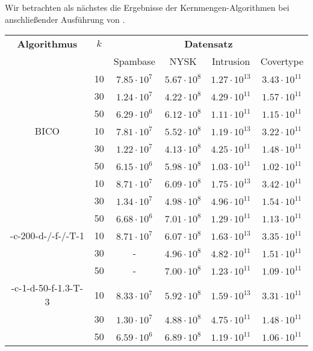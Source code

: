 Wir betrachten als nächstes die Ergebnisse der Kernmengen-Algorithmen bei anschließender Ausführung von \kmpp.
\begin{table}[h]
\centering
\begin{tabular}{@{}cccccc@{}} \toprule
	\textbf{Algorithmus} & $k$ & \multicolumn{4}{c}{\textbf{Datensatz}} \\
	\cmidrule(r){3-6} & 		& Spambase 				& NYSK 				& Intrusion 			& Covertype \\ \toprule
	\Skmpp 						& 10 & $7.85 \cdot 10^7$ & $5.67 \cdot 10^8$ & $1.27 \cdot 10^{13}$ & $3.43 \cdot 10^{11}$ \\
		 						& 30 & $1.24 \cdot 10^7$ & $4.22 \cdot 10^8$ & $4.29 \cdot 10^{11}$ & $1.57 \cdot 10^{11}$ \\
		 						& 50 & $6.29 \cdot 10^6$ & $6.12 \cdot 10^8$ & $1.11 \cdot 10^{11}$ & $1.15 \cdot 10^{11}$ \\
	\midrule
	BICO 						& 10 & $7.81 \cdot 10^7$ & $5.52 \cdot 10^8$ & $1.19 \cdot 10^{13}$ & $3.22 \cdot 10^{11}$ \\
			 					& 30 & $1.22 \cdot 10^7$ & $4.13 \cdot 10^8$ & $4.25 \cdot 10^{11}$ & $1.48 \cdot 10^{11}$ \\
		 						& 50 & $6.15 \cdot 10^6$ & $5.98 \cdot 10^8$ & $1.03 \cdot 10^{11}$ & $1.02 \cdot 10^{11}$ \\
	\midrule
	\kmpp 						& 10 & $8.71 \cdot 10^7$ & $6.09 \cdot 10^8$ & $1.75 \cdot 10^{13}$ & $3.42 \cdot 10^{11}$ \\
			 					& 30 & $1.34 \cdot 10^7$ & $4.98 \cdot 10^8$ & $4.96 \cdot 10^{11}$ & $1.54 \cdot 10^{11}$ \\
		 						& 50 & $6.68 \cdot 10^6$ & $7.01 \cdot 10^8$ & $1.29 \cdot 10^{11}$ & $1.13 \cdot 10^{11}$ \\
	\midrule
	\CsTwo-c-200-d-/-f-/-T-1	& 10 & $8.71 \cdot 10^7$ & $6.07 \cdot 10^8$ & $1.63 \cdot 10^{13}$ & $3.35 \cdot 10^{11}$ \\
			 					& 30 & - 				& $4.96 \cdot 10^8$ & $4.82 \cdot 10^{11}$ & $1.51 \cdot 10^{11}$ \\
		 						& 50 & - 				& $7.00 \cdot 10^8$	& $1.23 \cdot 10^{11}$ & $1.09 \cdot 10^{11}$ \\
	\midrule
	\CsTwo-c-1-d-50-f-1.3-T-3	& 10 & $8.33 \cdot 10^7$ & $5.92 \cdot 10^8$ & $1.59 \cdot 10^{13}$ & $3.31 \cdot 10^{11}$ \\
			 					& 30 & $1.30 \cdot 10^7$ & $4.88 \cdot 10^8$ & $4.75 \cdot 10^{11}$ & $1.48 \cdot 10^{11}$ \\
		 						& 50 & $6.59 \cdot 10^6$ & $6.89 \cdot 10^8$ & $1.19 \cdot 10^{11}$ & $1.06 \cdot 10^{11}$ \\

\end{tabular}
\end{table}
